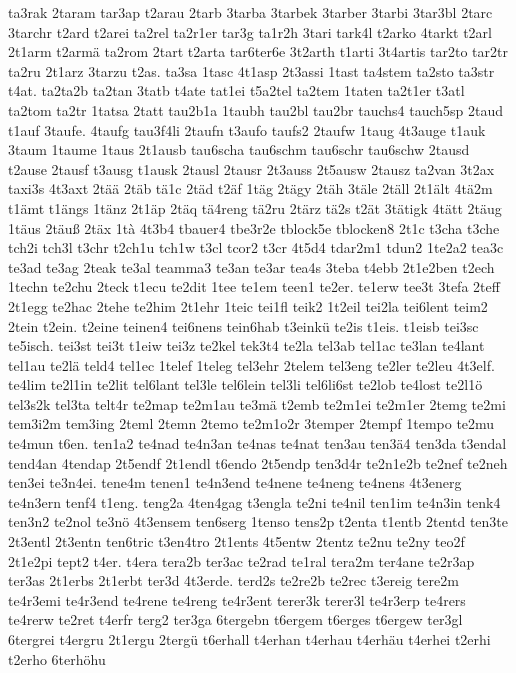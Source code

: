 {ta3rak
2taram
tar3ap
t2arau
2tarb
3tarba
3tarbek
3tarber
3tarbi
3tar3bl
2tarc
3tarchr
t2ard
t2arei
ta2rel
ta2r1er
tar3g
ta1r2h
3tari
tark4l
t2arko
4tarkt
t2arl
2t1arm
t2armä
ta2rom
2tart
t2arta
tar6ter6e
3t2arth
t1arti
3t4artis
tar2to
tar2tr
ta2ru
2t1arz
3tarzu
t2as.
ta3sa
1tasc
4t1asp
2t3assi
1tast
ta4stem
ta2sto
ta3str
t4at.
ta2ta2b
ta2tan
3tatb
t4ate
tat1ei
t5a2tel
ta2tem
1taten
ta2t1er
t3atl
ta2tom
ta2tr
1tatsa
2tatt
tau2b1a
1taubh
tau2bl
tau2br
tauchs4
tauch5sp
2taud
t1auf
3taufe.
4taufg
tau3f4li
2taufn
t3aufo
taufs2
2taufw
1taug
4t3auge
t1auk
3taum
1taume
1taus
2t1ausb
tau6scha
tau6schm
tau6schr
tau6schw
2tausd
t2ause
2tausf
t3ausg
t1ausk
2tausl
2tausr
2t3auss
2t5ausw
2tausz
ta2van
3t2ax
taxi3s
4t3axt
2tää
2täb
tä1c
2täd
t2äf
1täg
2tägy
2täh
3täle
2täll
2t1ält
4tä2m
t1ämt
t1ängs
1tänz
2t1äp
2täq
tä4reng
tä2ru
2tärz
tä2s
t2ät
3tätigk
4tätt
2täug
1täus
2täuß
2täx
1tà
4t3b4
tbauer4
tbe3r2e
tblock5e
tblocken8
2t1c
t3cha
t3che
tch2i
tch3l
t3chr
t2ch1u
tch1w
t3cl
tcor2
t3cr
4t5d4
tdar2m1
tdun2
1te2a2
tea3c
te3ad
te3ag
2teak
te3al
teamma3
te3an
te3ar
tea4s
3teba
t4ebb
2t1e2ben
t2ech
1techn
te2chu
2teck
t1ecu
te2dit
1tee
te1em
teen1
te2er.
te1erw
tee3t
3tefa
2teff
2t1egg
te2hac
2tehe
te2him
2t1ehr
1teic
tei1fl
teik2
1t2eil
tei2la
tei6lent
teim2
2tein
t2ein.
t2eine
teinen4
tei6nens
tein6hab
t3einkü
te2is
t1eis.
t1eisb
tei3sc
te5isch.
tei3st
tei3t
t1eiw
tei3z
te2kel
tek3t4
te2la
tel3ab
tel1ac
te3lan
te4lant
tel1au
te2lä
teld4
tel1ec
1telef
1teleg
tel3ehr
2telem
tel3eng
te2ler
te2leu
4t3elf.
te4lim
te2l1in
te2lit
tel6lant
tel3le
tel6lein
tel3li
tel6li6st
te2lob
te4lost
te2l1ö
tel3s2k
tel3ta
telt4r
te2map
te2m1au
te3mä
t2emb
te2m1ei
te2m1er
2temg
te2mi
tem3i2m
tem3ing
2teml
2temn
2temo
te2m1o2r
3temper
2tempf
1tempo
te2mu
te4mun
t6en.
ten1a2
te4nad
te4n3an
te4nas
te4nat
ten3au
ten3ä4
ten3da
t3endal
tend4an
4tendap
2t5endf
2t1endl
t6endo
2t5endp
ten3d4r
te2n1e2b
te2nef
te2neh
ten3ei
te3n4ei.
tene4m
tenen1
te4n3end
te4nene
te4neng
te4nens
4t3energ
te4n3ern
tenf4
t1eng.
teng2a
4ten4gag
t3engla
te2ni
te4nil
ten1im
te4n3in
tenk4
ten3n2
te2nol
te3nö
4t3ensem
ten6serg
1tenso
tens2p
t2enta
t1entb
2tentd
ten3te
2t3entl
2t3entn
ten6tric
t3en4tro
2t1ents
4t5entw
2tentz
te2nu
te2ny
teo2f
2t1e2pi
tept2
t4er.
t4era
tera2b
ter3ac
te2rad
te1ral
tera2m
ter4ane
te2r3ap
ter3as
2t1erbs
2t1erbt
ter3d
4t3erde.
terd2s
te2re2b
te2rec
t3ereig
tere2m
te4r3emi
te4r3end
te4rene
te4reng
te4r3ent
terer3k
terer3l
te4r3erp
te4rers
te4rerw
te2ret
t4erfr
terg2
ter3ga
6tergebn
t6ergem
t6erges
t6ergew
ter3gl
6tergrei
t4ergru
2t1ergu
2tergü
t6erhall
t4erhan
t4erhau
t4erhäu
t4erhei
t2erhi
t2erho
6terhöhu
}
